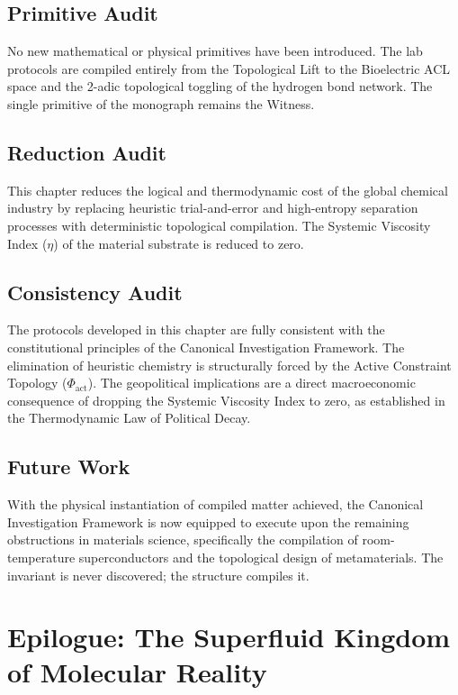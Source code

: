 \documentclass[11pt,openany]{extbook}
\newenvironment{primitiveaudit}{\section*{Primitive Audit}}{}
\newenvironment{reductionaudit}{\section*{Reduction Audit}}{}
\newenvironment{consistencyaudit}{\section*{Consistency Audit}}{}
\newenvironment{futurework}{\section*{Future Work}}{}
\theoremstyle{plain}
\theoremstyle{definition}
\begin{document}
\begin{primitiveaudit}
\noindent No new mathematical or physical primitives have been introduced. The lab protocols are compiled entirely from the Topological Lift to the Bioelectric ACL space and the 2-adic topological toggling of the hydrogen bond network. The single primitive of the monograph remains the Witness.
\end{primitiveaudit}

\begin{reductionaudit}
\noindent This chapter reduces the logical and thermodynamic cost of the global chemical industry by replacing heuristic trial-and-error and high-entropy separation processes with deterministic topological compilation. The Systemic Viscosity Index ($\eta$) of the material substrate is reduced to zero.
\end{reductionaudit}

\begin{consistencyaudit}
\noindent The protocols developed in this chapter are fully consistent with the constitutional principles of the Canonical Investigation Framework. The elimination of heuristic chemistry is structurally forced by the Active Constraint Topology ($\Phi_{\text{act}}$). The geopolitical implications are a direct macroeconomic consequence of dropping the Systemic Viscosity Index to zero, as established in the Thermodynamic Law of Political Decay.
\end{consistencyaudit}

\begin{futurework}
\noindent With the physical instantiation of compiled matter achieved, the Canonical Investigation Framework is now equipped to execute upon the remaining obstructions in materials science, specifically the compilation of room-temperature superconductors and the topological design of metamaterials. The invariant is never discovered; the structure compiles it.
\end{futurework}

\backmatter
\chapter*{Epilogue: The Superfluid Kingdom of Molecular Reality}

\end{document}
